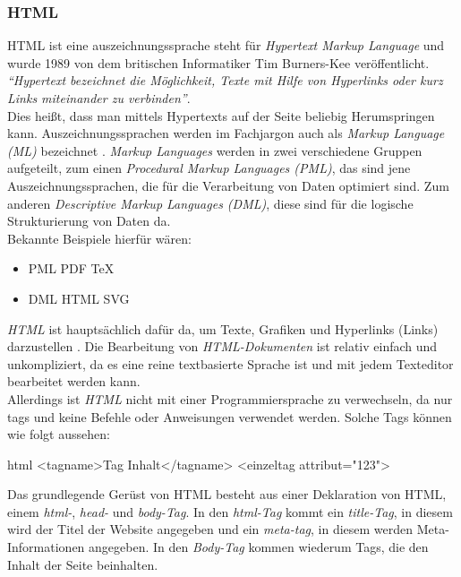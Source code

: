 		\subsubsection{HTML}
		HTML ist eine \Gls{auszeichnungssprache} steht für \textit{Hypertext Markup Language} und wurde 1989 von dem britischen Informatiker Tim Burners-Kee veröffentlicht.\\ 
		\textit{\enquote{Hypertext bezeichnet die Möglichkeit, Texte mit Hilfe von Hyperlinks oder kurz Links miteinander zu verbinden}}\cite{html5-css3-def}.\\ 
		Dies heißt, dass man mittels Hypertexts auf der Seite beliebig Herumspringen kann.
		Auszeichnungssprachen werden im Fachjargon auch als \textit{Markup Language (ML)} bezeichnet \cite{auszeichnungssprachen}. \textit{Markup Languages} werden in zwei verschiedene Gruppen aufgeteilt, zum einen \textit{Procedural Markup Languages (PML)}, das sind jene Auszeichnungssprachen, die für die Verarbeitung von Daten optimiert sind. Zum anderen \textit{Descriptive Markup Languages (DML)}, diese sind für die logische Strukturierung von Daten da.\\Bekannte Beispiele hierfür wären:
		\begin{itemize}
		\item PML
		\subitem PDF
		\subitem TeX
		\item DML
		\subitem HTML
		\subitem SVG
		\end{itemize}
		\textit{HTML} ist hauptsächlich dafür da, um Texte, Grafiken und Hyperlinks (Links) darzustellen \cite{html5-css3-handbuch, html5-css3-def}. Die Bearbeitung von \textit{HTML-Dokumenten} ist relativ einfach und unkompliziert, da es eine reine textbasierte Sprache ist und mit jedem Texteditor bearbeitet werden kann.\\
		Allerdings ist \textit{HTML} nicht mit einer Programmiersprache zu verwechseln, da nur \Gls{tag}s und keine Befehle oder Anweisungen verwendet werden. Solche Tags können wie folgt aussehen:
		\begin{code}{html}
			<tagname>Tag Inhalt</tagname>
			<einzeltag attribut="123">
		\end{code}
		Das grundlegende Gerüst von HTML besteht aus einer Deklaration von HTML, einem \textit{html-}, \textit{head-} und \textit{body-Tag}. In den \textit{html-Tag} kommt ein \textit{title-Tag}, in diesem wird der Titel der Website angegeben und ein \textit{meta-tag}, in diesem werden Meta-Informationen angegeben. In den \textit{Body-Tag} kommen wiederum Tags, die den Inhalt der Seite beinhalten. 
